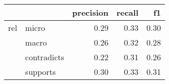 \begin{tabular}{llrrr}
\toprule
    &          &  precision &  recall &   f1 \\
\midrule
rel & micro &       0.29 &    0.33 & 0.30 \\
    & macro &       0.26 &    0.32 & 0.28 \\
    & contradicts &       0.22 &    0.31 & 0.26 \\
    & supports &       0.30 &    0.33 & 0.31 \\
\bottomrule
\end{tabular}
